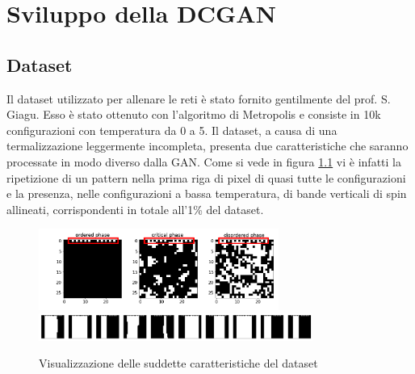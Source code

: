 \documentclass[Lau, noexaminfo, oneside]{sapthesis} %
\begin{document}
\chapter{Sviluppo della DCGAN}
\section{Dataset}
Il dataset utilizzato per allenare le reti è stato fornito gentilmente del prof. S. Giagu. Esso è stato ottenuto con l'algoritmo di Metropolis e consiste in 10k configurazioni con temperatura da 0 a 5. Il dataset, a causa di una termalizzazione leggermente incompleta, presenta due caratteristiche che saranno processate in modo diverso dalla GAN. Come si vede in figura \ref{difetti} vi è infatti la ripetizione di un pattern nella prima riga di pixel di quasi tutte le configurazioni e la presenza, nelle configurazioni a bassa temperatura, di bande verticali di spin allineati, corrispondenti in totale all'1\% del dataset.
\begin{figure}[H]
\includegraphics[width=0.7\textwidth]{dataset.png}\\
\includegraphics[width=0.8\textwidth]{difetti.png}
\centering
\caption{Visualizzazione delle suddette caratteristiche del dataset}
\label{difetti}
\end{figure}
\end{document}
